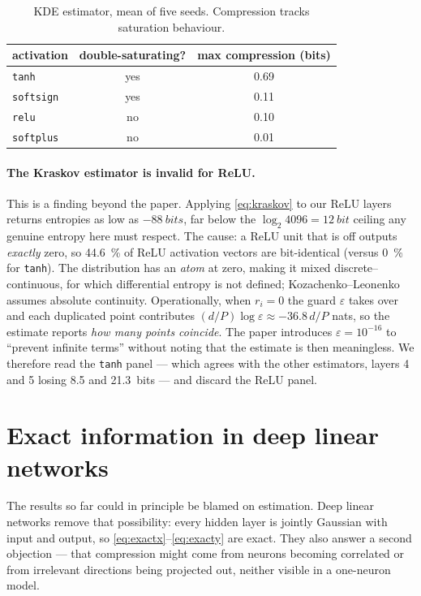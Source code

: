 \documentclass[11pt,a4paper]{article}
\begin{document}
\begin{table}[h]
\centering
\small
\begin{tabular}{lcc}
\toprule
\textbf{activation} & \textbf{double-saturating?} & \textbf{max compression (bits)} \\
\midrule
\texttt{tanh}     & yes & 0.69 \\
\texttt{softsign} & yes & 0.11 \\
\texttt{relu}     & no  & 0.10 \\
\texttt{softplus} & no  & 0.01 \\
\bottomrule
\end{tabular}
\caption{KDE estimator, mean of five seeds. Compression tracks saturation
behaviour.}
\label{tab:kde}
\end{table}

\paragraph{The Kraskov estimator is invalid for ReLU.} This is a finding beyond
the paper. Applying \eqref{eq:kraskov} to our ReLU layers returns entropies as
low as $-\SI{88}{bits}$, far below the $\log_2 4096 = \SI{12}{bit}$ ceiling any
genuine entropy here must respect. The cause: a ReLU unit that is off outputs
\emph{exactly} zero, so \SI{44.6}{\percent} of ReLU activation vectors are
bit-identical (versus \SI{0}{\percent} for \texttt{tanh}). The distribution has an
\emph{atom} at zero, making it mixed discrete--continuous, for which differential
entropy is not defined; Kozachenko--Leonenko assumes absolute continuity.
Operationally, when $r_i=0$ the guard $\varepsilon$ takes over and each duplicated
point contributes $(d/P)\log\varepsilon \approx -36.8\,d/P$ nats, so the estimate
reports \emph{how many points coincide}. The paper introduces
$\varepsilon=10^{-16}$ to ``prevent infinite terms'' without noting that the
estimate is then meaningless. We therefore read the \texttt{tanh} panel --- which
agrees with the other estimators, layers 4 and 5 losing \SI{8.5}{} and
\SI{21.3}{bits} --- and discard the ReLU panel.

\section{Exact information in deep linear networks}

The results so far could in principle be blamed on estimation. Deep linear
networks remove that possibility: every hidden layer is jointly Gaussian with
input and output, so \eqref{eq:exactx}--\eqref{eq:exacty} are exact. They also
answer a second objection --- that compression might come from neurons becoming
correlated or from irrelevant directions being projected out, neither visible in
a one-neuron model.
\end{document}
